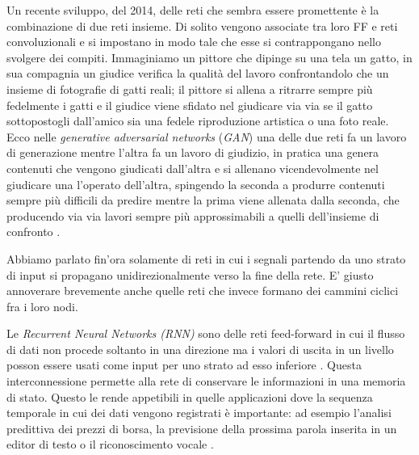 Un recente sviluppo, del 2014, delle reti che sembra essere promettente è la combinazione di due reti insieme. Di solito vengono associate tra loro FF e reti convoluzionali e si impostano in modo tale che esse si contrappongano nello svolgere dei compiti. Immaginiamo un pittore che dipinge su una tela un gatto, in sua compagnia un giudice verifica la qualità del lavoro confrontandolo che un insieme di fotografie di gatti reali; il pittore si allena a ritrarre sempre più fedelmente i gatti e il giudice viene sfidato nel giudicare via via se il gatto sottopostogli dall'amico sia una fedele riproduzione artistica o una foto reale. Ecco nelle \emph{generative adversarial networks} (\textit{GAN}) una delle due reti fa un lavoro di generazione mentre l'altra fa un lavoro di giudizio, in pratica una genera contenuti che vengono giudicati dall'altra e si allenano vicendevolmente nel giudicare una l'operato dell'altra, spingendo la seconda a produrre contenuti sempre più difficili da predire mentre la prima viene allenata dalla seconda, che producendo via via lavori sempre più approssimabili a quelli dell'insieme di confronto \cite{goodfellow2014generative}.

Abbiamo parlato fin'ora solamente di reti in cui i segnali partendo da uno strato di input si propagano unidirezionalmente verso la fine della rete. E' giusto annoverare brevemente anche quelle reti che invece formano dei cammini ciclici fra i loro nodi.

Le \emph{Recurrent Neural Networks (RNN)} sono delle reti feed-forward in cui il flusso di dati non procede soltanto in una direzione ma i valori di uscita in un livello posson essere usati come input per uno strato ad esso inferiore \cite{elman1990finding}. Questa interconnessione permette alla rete di conservare le informazioni in una memoria di stato. Questo le rende appetibili in quelle applicazioni dove la sequenza temporale in cui dei dati vengono registrati è importante: ad esempio l'analisi predittiva dei prezzi di borsa, la previsione della prossima parola inserita in un editor di testo o il riconoscimento vocale \cite{rrn-medium}.

